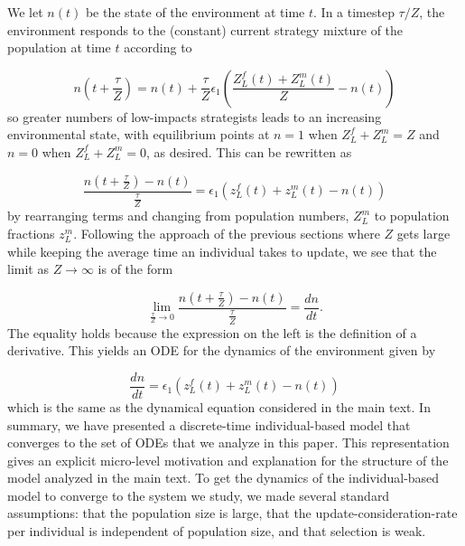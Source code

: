 \documentclass{article}
\begin{document}
We let $n(t)$ be the state of the environment at time $t$. In a timestep $\tau/Z$, the environment responds to the (constant) current strategy mixture of the population at time $t$ according to 

\begin{equation}
    n(t+\frac{\tau}{Z}) = n(t) + \frac{\tau}{Z}\epsilon_1\left(\frac{Z_L^f(t) + Z_L^m(t)}{Z} - n(t)\right)
\end{equation}
so greater numbers of low-impacts strategists leads to an increasing environmental state, with equilibrium points at $n=1$ when $Z_L^f + Z_L^m = Z$ and $n=0$ when $Z_L^f + Z_L^m = 0 $, as desired. This can be rewritten as 

\begin{equation}
    \frac{n(t+\frac{\tau}{Z})-n(t)}{\frac{\tau}{Z}} = \epsilon_1\left(z_L^f(t) + z_L^m(t) - n(t)\right)
\end{equation}
by rearranging terms and changing from population numbers, $Z_L^m$ to population fractions $z_L^m$. Following the approach of the previous sections where $Z$ gets large while keeping the average time an individual takes to update, we see that the limit as $Z\to\infty$ is of the form

\begin{equation}
    \lim_{\frac{\tau}{Z}\to0}\frac{n(t+\frac{\tau}{Z})-n(t)}{\frac{\tau}{Z}} =\frac{dn}{dt}.
\end{equation}
The equality holds because the expression on the left is the definition of a derivative. This yields an ODE for the dynamics of the environment given by

\begin{equation}
    \frac{dn}{dt} = \epsilon_1\left(z_L^f(t) + z_L^m(t) - n(t)\right)
\end{equation}
which is the same as the dynamical equation considered in the main text. In summary, we have presented a discrete-time individual-based model that converges to the set of ODEs that we analyze in this paper. This representation gives an explicit micro-level motivation and explanation for the structure of the model analyzed in the main text. To get the dynamics of the individual-based model to converge to the system we study, we made several standard assumptions: that the population size is large, that the update-consideration-rate per individual is independent of population size, and that selection is weak.
\end{document}
